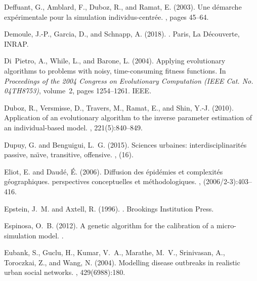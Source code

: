\documentclass[10pt]{article}
\begin{document}
\begin{thebibliography}{}
Deffuant, G., Amblard, F., Duboz, R., and Ramat, E. (2003).
\newblock Une d{\'e}marche exp{\'e}rimentale pour la simulation
  individus-centr{\'e}e.
, pages 45--64.

Demoule, J.-P., Garcia, D., and Schnapp, A. (2018).
.
\newblock Paris, La Découverte, INRAP.

Di~Pietro, A., While, L., and Barone, L. (2004).
\newblock Applying evolutionary algorithms to problems with noisy,
  time-consuming fitness functions.
\newblock In {\em Proceedings of the 2004 Congress on Evolutionary Computation
  (IEEE Cat. No. 04TH8753)}, volume~2, pages 1254--1261. IEEE.

Duboz, R., Versmisse, D., Travers, M., Ramat, E., and Shin, Y.-J. (2010).
\newblock Application of an evolutionary algorithm to the inverse parameter
  estimation of an individual-based model.
, 221(5):840--849.

Dupuy, G. and Benguigui, L.~G. (2015).
\newblock Sciences urbaines: interdisciplinarit{\'e}s passive, na{\"\i}ve,
  transitive, offensive.
, (16).

Eliot, E. and Daud{\'e}, {\'E}. (2006).
\newblock Diffusion des {\'e}pid{\'e}mies et complexit{\'e}s g{\'e}ographiques.
  perspectives conceptuelles et m{\'e}thodologiques.
, (2006/2-3):403--416.

Epstein, J.~M. and Axtell, R. (1996).
.
\newblock Brookings Institution Press.

Espinosa, O.~B. (2012).
\newblock A genetic algorithm for the calibration of a micro-simulation model.
.

Eubank, S., Guclu, H., Kumar, V.~A., Marathe, M.~V., Srinivasan, A., Toroczkai,
  Z., and Wang, N. (2004).
\newblock Modelling disease outbreaks in realistic urban social networks.
, 429(6988):180.


\end{thebibliography}
\end{document}
